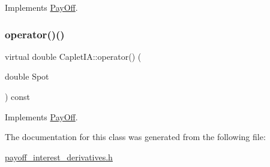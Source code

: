 Implements \hyperlink{classPayOff_ad8194d5b82247ae89c25c515f0ba806a}{Pay\+Off}.

\hypertarget{classCapletIA_a8dca8c52160a378ac2331ce95c688313}{}\label{classCapletIA_a8dca8c52160a378ac2331ce95c688313} 
\subsubsection{\texorpdfstring{operator()()}{operator()()}}
{\footnotesize\ttfamily virtual double Caplet\+I\+A\+::operator() (\begin{DoxyParamCaption}\item[{double}]{Spot }\end{DoxyParamCaption}) const\hspace{0.3cm}{\ttfamily [virtual]}}



Implements \hyperlink{classPayOff_a5ae17d82c233ef5568c8fb0539703000}{Pay\+Off}.



The documentation for this class was generated from the following file\+:\begin{DoxyCompactItemize}
\item 
\hyperlink{payoff__interest__derivatives_8h}{payoff\+\_\+interest\+\_\+derivatives.\+h}\end{DoxyCompactItemize}
